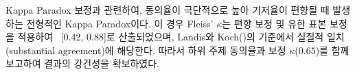 \noindent
Kappa Paradox 보정과 관련하여, 
동의율이 극단적으로 높아 기저율이 편향될 때
발생하는 전형적인 Kappa Paradox이다.
이 경우 Fleiss' $\kappa$는 편향 보정 및 유한 표본 보정을 적용하여
~[0.42, 0.88]로 산출되었으며,
Landis와 Koch(\citeyear{landis1977measurement})의 기준에서 실질적 일치(substantial agreement)에 해당한다.
따라서 하위 주제 동의율과 보정 $\kappa$($0.65$)를 함께 보고하여
결과의 강건성을 확보하였다.


